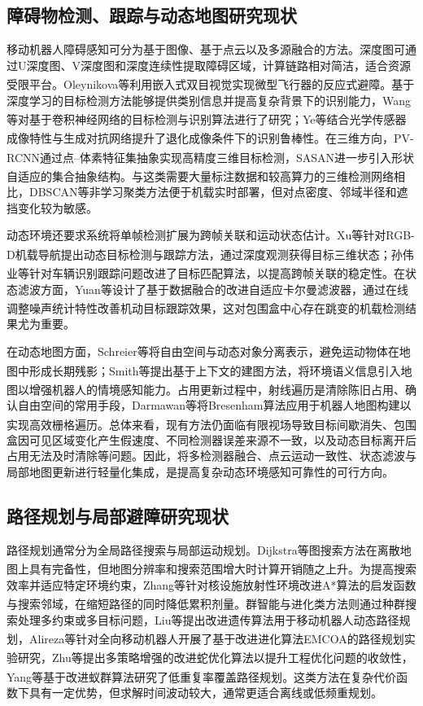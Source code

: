 \subsection{障碍物检测、跟踪与动态地图研究现状}
移动机器人障碍感知可分为基于图像、基于点云以及多源融合的方法。深度图可通过U深度图、V深度图和深度连续性提取障碍区域，计算链路相对简洁，适合资源受限平台。Oleynikova等利用嵌入式双目视觉实现微型飞行器的反应式避障\textsuperscript{\cite{7138979}}。基于深度学习的目标检测方法能够提供类别信息并提高复杂背景下的识别能力，Wang等对基于卷积神经网络的目标检测与识别算法进行了研究\textsuperscript{\cite{8865560}}；Ye等结合光学传感器成像特性与生成对抗网络提升了退化成像条件下的识别鲁棒性\textsuperscript{\cite{10835912}}。在三维方向，PV-RCNN通过点--体素特征集抽象实现高精度三维目标检测\textsuperscript{\cite{9157234}}，SASAN进一步引入形状自适应的集合抽象结构\textsuperscript{\cite{10372107}}。与这类需要大量标注数据和较高算力的三维检测网络相比，DBSCAN等非学习聚类方法便于机载实时部署，但对点密度、邻域半径和遮挡变化较为敏感。

动态环境还要求系统将单帧检测扩展为跨帧关联和运动状态估计。Xu等针对RGB-D机载导航提出动态目标检测与跟踪方法，通过深度观测获得目标三维状态\textsuperscript{\cite{10323166}}；孙伟业等针对车辆识别跟踪问题改进了目标匹配算法，以提高跨帧关联的稳定性\textsuperscript{\cite{JCDL202503143}}。在状态滤波方面，Yuan等设计了基于数据融合的改进自适应卡尔曼滤波器，通过在线调整噪声统计特性改善机动目标跟踪效果\textsuperscript{\cite{10086242}}，这对包围盒中心存在跳变的机载检测结果尤为重要。

在动态地图方面，Schreier等将自由空间与动态对象分离表示，避免运动物体在地图中形成长期残影\textsuperscript{\cite{7271102}}；Smith等提出基于上下文的建图方法，将环境语义信息引入地图以增强机器人的情境感知能力\textsuperscript{\cite{6523836}}。占用更新过程中，射线遍历是清除陈旧占用、确认自由空间的常用手段，Darmawan等将Bresenham算法应用于机器人地图构建以实现高效栅格遍历\textsuperscript{\cite{9702849}}。总体来看，现有方法仍面临有限视场导致目标间歇消失、包围盒因可见区域变化产生假速度、不同检测器误差来源不一致，以及动态目标离开后占用无法及时清除等问题。因此，将多检测器融合、点云运动一致性、状态滤波与局部地图更新进行轻量化集成，是提高复杂动态环境感知可靠性的可行方向。

\subsection{路径规划与局部避障研究现状}
路径规划通常分为全局路径搜索与局部运动规划。Dijkstra等图搜索方法在离散地图上具有完备性，但地图分辨率和搜索范围增大时计算开销随之上升\textsuperscript{\cite{9019345}}。为提高搜索效率并适应特定环境约束，Zhang等针对核设施放射性环境改进A*算法的启发函数与搜索邻域，在缩短路径的同时降低累积剂量\textsuperscript{\cite{ZHANG2025103711}}。群智能与进化类方法则通过种群搜索处理多约束或多目标问题，Liu等提出改进遗传算法用于移动机器人动态路径规划\textsuperscript{\cite{10151834}}，Alireza等针对全向移动机器人开展了基于改进进化算法EMCOA的路径规划实验研究\textsuperscript{\cite{9679713}}，Zhu等提出多策略增强的改进蛇优化算法以提升工程优化问题的收敛性\textsuperscript{\cite{ZHU2025127660}}，Yang等基于改进蚁群算法研究了低重复率覆盖路径规划\textsuperscript{\cite{11018948}}。这类方法在复杂代价函数下具有一定优势，但求解时间波动较大，通常更适合离线或低频重规划。

